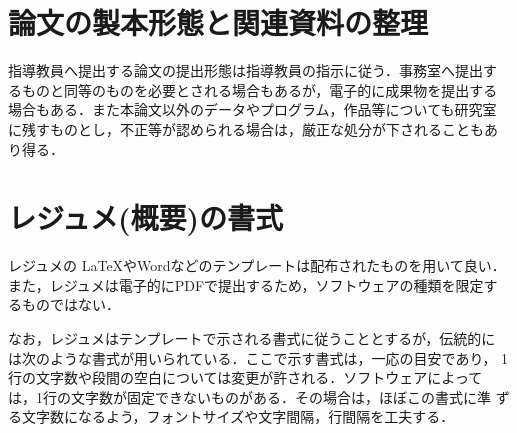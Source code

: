 \section{論文の製本形態と関連資料の整理}
\label{sec:style}

指導教員へ提出する論文の提出形態は指導教員の指示に従う．事務室へ提出す
るものと同等のものを必要とされる場合もあるが，電子的に成果物を提出する
場合もある．また本論文以外のデータやプログラム，作品等についても研究室
に残すものとし，不正等が認められる場合は，厳正な処分が下されることもあ
り得る．

\section{レジュメ(概要)の書式}
\label{sec:format_abst}

レジュメの \LaTeX やWordなどのテンプレートは配布されたものを用いて良い．
また，レジュメは電子的にPDFで提出するため，ソフトウェアの種類を限定す
るものではない．

なお，レジュメはテンプレートで示される書式に従うこととするが，伝統的に
は次のような書式が用いられている．ここで示す書式は，一応の目安であり，
1行の文字数や段間の空白については変更が許される．ソフトウェアによって
は，1行の文字数が固定できないものがある．その場合は，ほぼこの書式に準
ずる文字数になるよう，フォントサイズや文字間隔，行間隔を工夫する．

